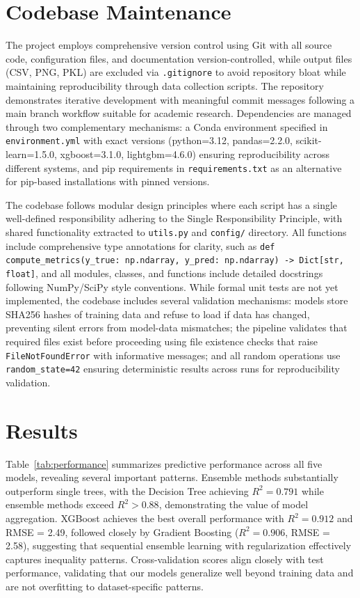 \documentclass[10pt,twocolumn]{article}
\begin{document}
\section{Codebase Maintenance}
\label{sec:maintenance}
\par The project employs comprehensive version control using Git with all source code, configuration files, and documentation version-controlled, while output files (CSV, PNG, PKL) are excluded via \texttt{.gitignore} to avoid repository bloat while maintaining reproducibility through data collection scripts. The repository demonstrates iterative development with meaningful commit messages following a main branch workflow suitable for academic research. Dependencies are managed through two complementary mechanisms: a Conda environment specified in \texttt{environment.yml} with exact versions (python=3.12, pandas=2.2.0, scikit-learn=1.5.0, xgboost=3.1.0, lightgbm=4.6.0) ensuring reproducibility across different systems, and pip requirements in \texttt{requirements.txt} as an alternative for pip-based installations with pinned versions.
\par The codebase follows modular design principles where each script has a single well-defined responsibility adhering to the Single Responsibility Principle, with shared functionality extracted to \texttt{utils.py} and \texttt{config/} directory. All functions include comprehensive type annotations for clarity, such as \texttt{def compute\_metrics(y\_true: np.ndarray, y\_pred: np.ndarray) -> Dict[str, float]}, and all modules, classes, and functions include detailed docstrings following NumPy/SciPy style conventions. While formal unit tests are not yet implemented, the codebase includes several validation mechanisms: models store SHA256 hashes of training data and refuse to load if data has changed, preventing silent errors from model-data mismatches; the pipeline validates that required files exist before proceeding using file existence checks that raise \texttt{FileNotFoundError} with informative messages; and all random operations use \texttt{random\_state=42} ensuring deterministic results across runs for reproducibility validation.

\section{Results}
\label{sec:results}

Table~\ref{tab:performance} summarizes predictive performance across all five models, revealing several important patterns. Ensemble methods substantially outperform single trees, with the Decision Tree achieving $R^2 = 0.791$ while ensemble methods exceed $R^2 > 0.88$, demonstrating the value of model aggregation. XGBoost achieves the best overall performance with $R^2 = 0.912$ and RMSE = 2.49, followed closely by Gradient Boosting ($R^2 = 0.906$, RMSE = 2.58), suggesting that sequential ensemble learning with regularization effectively captures inequality patterns. Cross-validation scores align closely with test performance, validating that our models generalize well beyond training data and are not overfitting to dataset-specific patterns.
\end{document}
